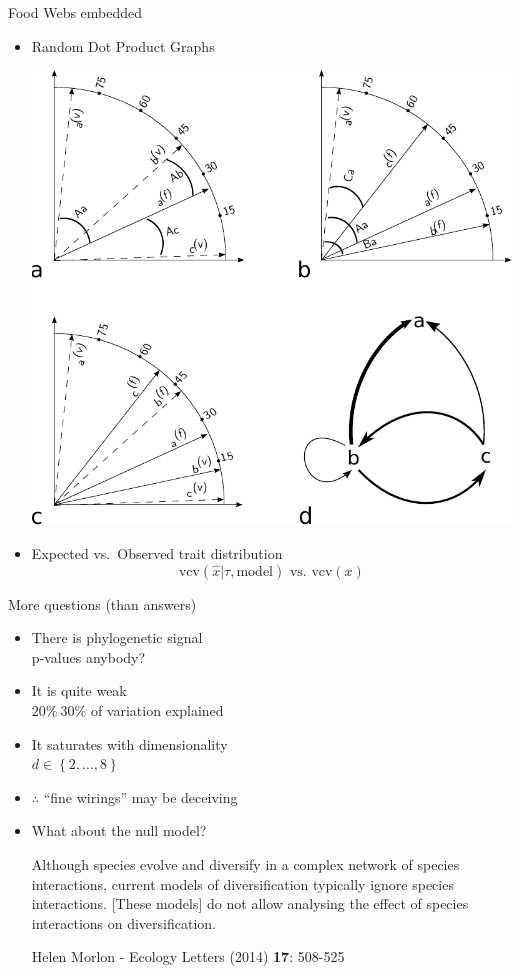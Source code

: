 \documentclass[]{beamer}
\begin{document}
\begin{frame}{Food Webs embedded}

\begin{itemize}[<+->]
\centering
\item
Random Dot Product Graphs

  \includegraphics[width=0.6\linewidth]{images/RDPGmodel.pdf}

\item
Expected vs.~Observed trait distribution
  \begin{equation*}
    \textrm{vcv}\left( \hat{x} | \tau, \mbox{model} \right) \mbox{ vs. } \textrm{vcv}\left(x\right)
  \end{equation*}

\end{itemize}

\end{frame}

\begin{frame}{More questions (than answers)}

\begin{itemize}[<+->]
\itemsep1pt\parskip0pt
\item
  There is phylogenetic signal\\
  {\tiny p-values anybody?}
\item
  It is quite weak\\
  {\tiny $20\% ~ 30\%$ of variation explained}
\item
  It saturates with dimensionality\\
  {\tiny $d \in \left\{2, \dots , 8 \right\}$}
\item
  $\therefore$ ``fine wirings'' may be deceiving
\item
What about the null model?

{\em
{\scriptsize Although species evolve and diversify in a complex network of species interactions, current models of diversification typically ignore species interactions. [These models] do not allow analysing the effect of species interactions on diversification.

Helen Morlon - \textrm{Ecology Letters} (2014) \textbf{17}: 508-525}
}
\end{itemize}

\end{frame}
\end{document}
